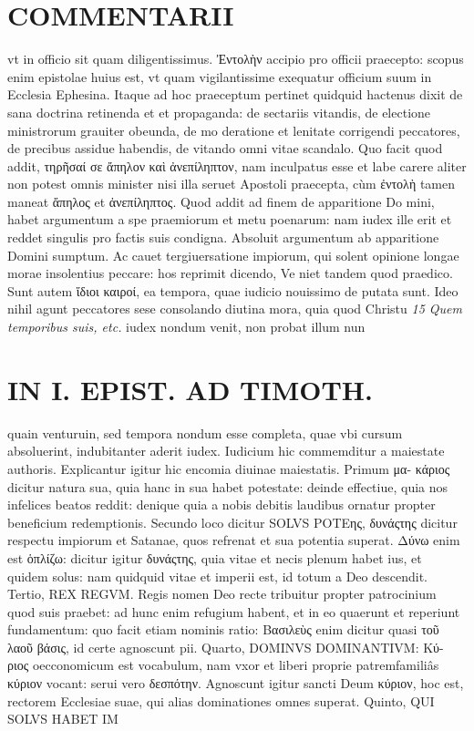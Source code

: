 \documentclass{article}
\begin{document}
\begin{pages}
\section*{COMMENTARII }
\marginpar{[ p.164 ]}\pstart vt in officio sit quam diligentissimus. Ἐντολὴν accipio pro officii praecepto: scopus enim epistolae huius est, vt quam vigilantissime exequatur officium suum in Ecclesia Ephesina. Itaque ad hoc praeceptum pertinet quidquid hactenus dixit de sana doctrina retinenda et et propaganda: de sectariis vitandis, de electione ministrorum grauiter obeunda, de mo deratione et lenitate corrigendi peccatores, de precibus assidue habendis, de vitando omni vitae scandalo. Quo facit quod addit, τηρῆσαί σε ἄπηλον καὶ ἀνεπίληπτον, nam inculpatus esse et labe carere aliter non potest omnis minister nisi illa seruet Apostoli praecepta, cùm ἐντολὴ tamen maneat ἄπηλος et ἀνεπίληπτος. Quod addit ad finem de apparitione Do mini, habet argumentum a spe praemiorum et metu poenarum: nam iudex ille erit et reddet singulis pro factis suis condigna. Absoluit argumentum ab apparitione Domini sumptum. Ac cauet tergiuersatione impiorum, qui solent opinione longae morae insolentius peccare: hos reprimit dicendo, Ve niet tandem quod praedico. Sunt autem ἵδιοι καιροί, ea tempora, quae iudicio nouissimo de putata sunt. Ideo nihil agunt peccatores sese consolando diutina mora, quia quod Christu  \pend
\textit{15 Quem temporibus suis, etc. }\pstart iudex nondum venit, non probat illum nun\pend
\section*{IN I. EPIST. AD TIMOTH. }
\marginpar{[ p.165 ]}\pstart quain venturuin, sed tempora nondum esse completa, quae vbi cursum absoluerint, indubitanter aderit iudex. Iudicium hic commemditur a maiestate authoris. Explicantur igitur hic encomia diuinae maiestatis. Primum μα- κάριος dicitur natura sua, quia hanc in sua habet potestate: deinde effectiue, quia nos infelices beatos reddit: denique quia a nobis debitis laudibus ornatur propter beneficium redemptionis. Secundo loco dicitur SOLVS POΤEης, δυνάςτης dicitur respectu impiorum et Satanae, quos refrenat et sua potentia superat. Δύνω enim est ὁπλίζω: dicitur igitur δυνάςτης, quia vitae et necis plenum habet ius, et quidem solus: nam quidquid vitae et imperii est, id totum a Deo descendit. Tertio, REX REGVM. Regis nomen Deo recte tribuitur propter patrocinium quod suis praebet: ad hunc enim refugium habent, et in eo quaerunt et reperiunt fundamentum: quo facit etiam nominis ratio: Βασιλεὺς enim dicitur quasi τοῦ λαοῦ βάσις, id certe agnoscunt pii.  \pend\pstart Quarto, DOMINVS DOMINANTIVM: Κύ- ριος oecconomicum est vocabulum, nam vxor et liberi proprie patremfamiliâs κύριον vocant: serui vero δεσπότην. Agnoscunt igitur sancti Deum κύριον, hoc est, rectorem Ecclesiae suae, qui alias dominationes omnes superat.  \pend\pstart Quinto, QUI SOLVS HABET IM\pend

\end{pages}
\end{document}
